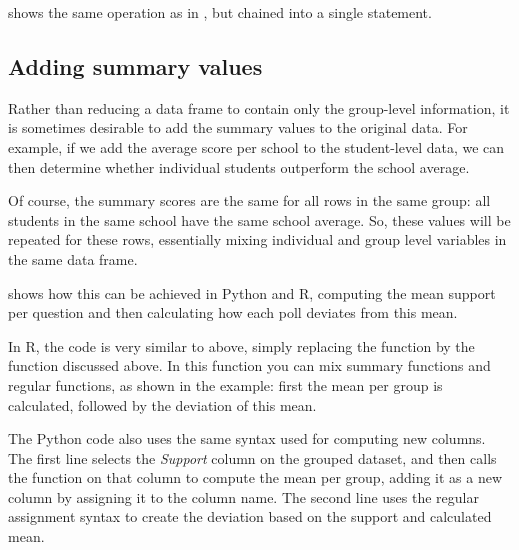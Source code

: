 
 shows the same operation as in , but chained into a single statement.


\subsection{Adding summary values}

Rather than reducing a data frame to contain only the group-level information,
it is sometimes desirable to add the summary values to the original data.
For example, if we add the average score per school to the student-level data,
we can then determine whether individual students outperform the school average.

Of course, the summary scores are the same for all rows in the same group:
all students in the same school have the same school average.
So, these values will be repeated for these rows, essentially
mixing individual and group level variables in the same data frame.


 shows how this can be achieved in Python and R,
computing the mean support per question and then calculating how each poll deviates from this mean. 

In R, the code is very similar to  above, simply
replacing the  function  by the function  discussed above.
In this function you can mix summary functions and regular functions, as shown in the example:
first the mean per group is calculated, followed by the deviation of this mean.

The Python code also uses the same syntax used for computing new columns.
The first line selects the \emph{Support} column on the grouped dataset,
and then calls the  function  on that column to compute the mean per group,
adding it as a new column by assigning it to the column name.
The second line uses the regular assignment syntax to create the deviation based on the support and calculated mean. 

